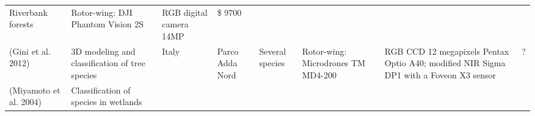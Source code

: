 \documentclass[]{interact}
\theoremstyle{plain}%
\theoremstyle{definition}
\theoremstyle{remark}
\begin{document}
\begin{longtable}[]{@{}llllllll@{}}
\begin{minipage}[t]{0.10\columnwidth}
Riverbank forests\strut
\end{minipage} & \begin{minipage}[t]{0.09\columnwidth}\raggedright\strut
Rotor-wing: DJI Phantom Vision 2S\strut
\end{minipage} & \begin{minipage}[t]{0.11\columnwidth}\raggedright\strut
RGB digital camera 14MP\strut
\end{minipage} & \begin{minipage}[t]{0.01\columnwidth}\raggedright\strut
\$ 9700\strut
\end{minipage}\tabularnewline
\begin{minipage}[t]{0.11\columnwidth}\raggedright\strut
(Gini et al. 2012)\strut
\end{minipage} & \begin{minipage}[t]{0.18\columnwidth}\raggedright\strut
3D modeling and classification of tree species\strut
\end{minipage} & \begin{minipage}[t]{0.03\columnwidth}\raggedright\strut
Italy\strut
\end{minipage} & \begin{minipage}[t]{0.14\columnwidth}\raggedright\strut
Parco Adda Nord\strut
\end{minipage} & \begin{minipage}[t]{0.10\columnwidth}\raggedright\strut
Several species\strut
\end{minipage} & \begin{minipage}[t]{0.09\columnwidth}\raggedright\strut
Rotor-wing: Microdrones TM MD4-200\strut
\end{minipage} & \begin{minipage}[t]{0.11\columnwidth}\raggedright\strut
RGB CCD 12 megapixels Pentax Optio A40; modified NIR Sigma DP1 with a
Foveon X3 sensor\strut
\end{minipage} & \begin{minipage}[t]{0.01\columnwidth}\raggedright\strut
?\strut
\end{minipage}\tabularnewline
\begin{minipage}[t]{0.11\columnwidth}\raggedright\strut
(Miyamoto et al. 2004)\strut
\end{minipage} & \begin{minipage}[t]{0.18\columnwidth}\raggedright\strut
Classification of species in wetlands\strut
\end{minipage} & \begin{minipage}[t]{0.03\columnwidth}\raggedright\strut

\end{minipage}
\end{longtable}
\end{document}
